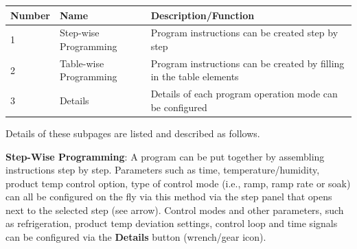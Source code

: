 \begin{longtable}[]{@{}lll@{}}
\toprule
\begin{minipage}[b]{0.18\columnwidth}\raggedright
Number\strut
\end{minipage} & \begin{minipage}[b]{0.25\columnwidth}\raggedright
Name\strut
\end{minipage} & \begin{minipage}[b]{0.48\columnwidth}\raggedright
Description/Function\strut
\end{minipage}\tabularnewline
\midrule
\endhead
\begin{minipage}[t]{0.18\columnwidth}\raggedright
1\strut
\end{minipage} & \begin{minipage}[t]{0.25\columnwidth}\raggedright
Step-wise Programming\strut
\end{minipage} & \begin{minipage}[t]{0.48\columnwidth}\raggedright
Program instructions can be created step by step\strut
\end{minipage}\tabularnewline
\begin{minipage}[t]{0.18\columnwidth}\raggedright
2\strut
\end{minipage} & \begin{minipage}[t]{0.25\columnwidth}\raggedright
Table-wise Programming\strut
\end{minipage} & \begin{minipage}[t]{0.48\columnwidth}\raggedright
Program instructions can be created by filling in the table
elements\strut
\end{minipage}\tabularnewline
\begin{minipage}[t]{0.18\columnwidth}\raggedright
3\strut
\end{minipage} & \begin{minipage}[t]{0.25\columnwidth}\raggedright
Details\strut
\end{minipage} & \begin{minipage}[t]{0.48\columnwidth}\raggedright
Details of each program operation mode can be configured\strut
\end{minipage}\tabularnewline
\bottomrule
\end{longtable}

Details of these subpages are listed and described as follows.

\textbf{Step-Wise Programming}: A program can be put together by
assembling instructions step by step. Parameters such as time,
temperature/humidity, product temp control option, type of control mode
(i.e., ramp, ramp rate or soak) can all be configured on the fly via
this method via the step panel that opens next to the selected step (see
arrow). Control modes and other parameters, such as refrigeration,
product temp deviation settings, control loop and time signals can be
configured via the \textbf{Details} button (wrench/gear icon).

